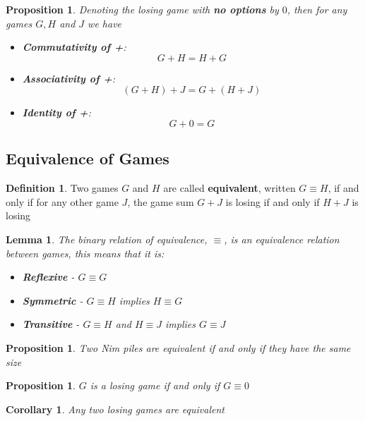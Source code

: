 \documentclass[11pt]{article}
\theoremstyle{plain}
\newtheorem{lemma}[theorem]{Lemma}
\newtheorem{proposition}[theorem]{Proposition}
\newtheorem{corollary}[theorem]{Corollary}
\theoremstyle{definition}
\newtheorem{definition}[theorem]{Definition}
\theoremstyle{remark}
\begin{document}
\begin{proposition}
    Denoting the losing game with \textbf{no options} by \(0\), then for any games \(G,H\) and \(J\) we have
    \begin{itemize}
        \item \textbf{Commutativity of +}:
        \[
            G + H = H + G
        \]
        \item \textbf{Associativity of +}:
        \[
            (G + H) + J = G + (H + J)
        \]
        \item \textbf{Identity of +}:
        \[
            G + 0 = G
        \]
    \end{itemize}
\end{proposition}

\subsection{Equivalence of Games}
\begin{definition}
    Two games \(G\) and \(H\) are called \textbf{equivalent}, written \(G \equiv H\), if and only if for any other game \(J\), the game sum \(G+J\) is losing if and only if \(H + J\) is losing
\end{definition}

\begin{lemma}
    The binary relation of equivalence, \(\equiv\), is an equivalence relation between games, this means that it is:
    \begin{itemize}
        \item \textbf{Reflexive} - \(G \equiv G\)
        \item \textbf{Symmetric} - \(G \equiv H\) implies \(H \equiv G\)
        \item \textbf{Transitive} - \(G \equiv H\) and \(H \equiv J\) implies \(G \equiv J\)
    \end{itemize}
\end{lemma}

\begin{proposition}
    Two Nim piles are equivalent if and only if they have the same size
\end{proposition}

\begin{proposition}
    \(G\) is a losing game if and only if \(G \equiv 0\)
\end{proposition}

\begin{corollary}
    Any two losing games are equivalent
\end{corollary}
\end{document}
